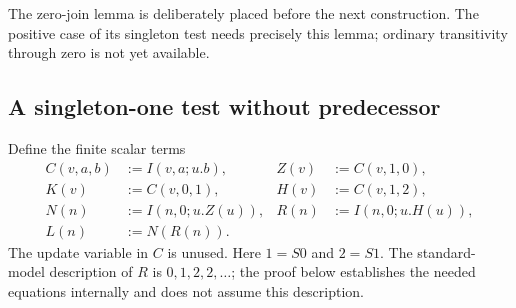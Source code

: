 \documentclass[11pt,letterpaper]{article}
\theoremstyle{definition}
\begin{document}
The zero-join lemma is deliberately placed before the next construction.
The positive case of its singleton test needs precisely this lemma;
ordinary transitivity through zero is not yet available.

\subsection{A singleton-one test without predecessor}

Define the finite scalar terms
\[
\begin{aligned}
 C(v,a,b)&:=I(v,a;u.b),& Z(v)&:=C(v,1,0),\\
 K(v)&:=C(v,0,1),& H(v)&:=C(v,1,2),\\
 N(n)&:=I(n,0;u.Z(u)),& R(n)&:=I(n,0;u.H(u)),\\
 L(n)&:=N(R(n)).
\end{aligned}
\tag{Tests}\label{zs:tests}
\]
The update variable in $C$ is unused. Here $1=S0$ and $2=S1$.
The standard-model description of $R$ is $0,1,2,2,\ldots$; the proof
below establishes the needed equations internally and does not assume
this description.
\end{document}
